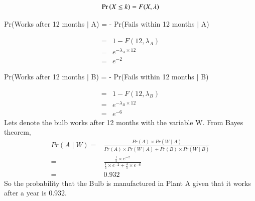 \documentclass[journal,12pt,twocolumn]{IEEEtran}
\begin{document}
\begin{align}
    \Pr\left(X\leq k\right) = F(X,\lambda)
\end{align}
\begin{center}
    Pr(Works after 12 months $\mid$ A) =  - Pr(Fails within 12 months $\mid$ A)\\
\end{center}
\begin{align}
    =& 1 - F(12,\lambda_A)\\
    =& {e}^{\displaystyle - \lambda_A \times 12}\\
    =& {e}^{-2}
\end{align}
\begin{center}
    Pr(Works after 12 months $\mid$ B) =  - Pr(Fails within 12 months $\mid$ B)
\end{center}
\begin{align}
    =& 1 - F(12,\lambda_B)\\
    =& {e}^{\displaystyle -\lambda_B \times 12}\\
    =& {e}^{-6}
\end{align}
Lets denote the bulb works after 12 months with the variable W. From Bayes theorem,\\
\begin{align}
    Pr(A \mid W) = & \displaystyle{\frac{Pr(A) \times Pr(W \mid A)}{Pr(A) \times Pr(W \mid A) + Pr(B) \times Pr(W \mid B)}}\\
    = & \displaystyle{\frac{ \displaystyle{\frac{1}{5}} \times {e}^{-2}}{\displaystyle{\frac{1}{5}} \times {e}^{-2} + \displaystyle{\frac{4}{5}} \times {e}^{-6}}}\\[0.5cm]
    = & 0.932
\end{align}
So the probability that the Bulb is manufactured in Plant A given that it works after a year is 0.932.
\pagebreak
\end{document}
